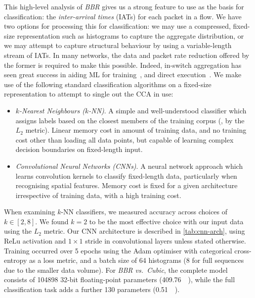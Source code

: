This high-level analysis of \emph{BBR} gives us a strong feature to use as the basis for classification: the \emph{inter-arrival times} (IATs) for each packet in a flow.
We have two options for processing this for classification: we may use a compressed, fixed-size representation such as histograms to capture the aggregate distribution, or we may attempt to capture structural behaviour by using a variable-length stream of IATs.
In many networks, the data and packet rate reduction offered by the former is required to make this possible.
Indeed, in-switch aggregation has seen great success in aiding ML for training~\cite{DBLP:conf/isca/LiLYCSH19}, and direct execution~\cite{DBLP:conf/hotnets/XiongZ19}.
We make use of the following standard classification algorithms on a fixed-size representation to attempt to single out the CCA in use:

\begin{itemize}
    \item \emph{$k$-Nearest Neighbours ($k$-NN)}. A simple and well-understood classifier which assigns labels based on the closest members of the training corpus (\ie, by the $L_2$ metric). Linear memory cost in amount of training data, and no training cost other than loading all data points, but capable of learning complex decision boundaries on fixed-length input.
    
    \item \emph{Convolutional Neural Networks (CNNs)}. A neural network approach which learns convolution kernels to classify fixed-length data, particularly when recognising spatial features. Memory cost is fixed for a given architecture irrespective of training data, with a high training cost.
\end{itemize}

When examining $k$-NN classifiers, we measured accuracy across choices of $k \in \left[2, 8\right]$.
We found $k=2$ to be the most effective choice with our input data using the $L_2$ metric.
Our CNN architecture is described in \cref{tab:cnn-arch}, using ReLu activation and $1 \times 1$ stride in convolutional layers unless stated otherwise.
Training occurred over 5 epochs using the Adam optimiser with categorical cross-entropy as a loss metric, and a batch size of \num{64} histograms (\num{8} for full sequences due to the smaller data volume).
For \emph{BBR vs.\ Cubic}, the complete model consists of \num{104898} 32-bit floating-point parameters (\SI{409.76}{\kibi\byte}), while the full classification task adds a further \num{130} parameters (\SI{0.51}{\kibi\byte}).

